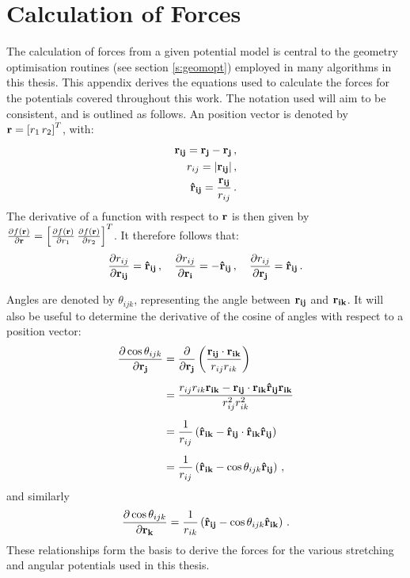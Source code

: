 \chapter{Calculation of Forces}
\label{app:forces}

The calculation of forces from a given potential model is central to the geometry optimisation routines (see section \ref{s:geomopt}) employed in many algorithms in this thesis.
This appendix derives the equations used to calculate the forces for the potentials covered throughout this work.
The notation used will aim to be consistent, and is outlined as follows.
An position vector is denoted by $\mathbf{r}=\left[r_1\, r_2\right]^{T}$, with:
\begin{align}
	\mathbf{r_{ij}}=\mathbf{r_j}-\mathbf{r_j}\,, \\
	r_{ij}=\lvert\mathbf{r_{ij}}\rvert\,, \\
	\boldsymbol{\hat{\mathbf{r}}_{\mathbf{ij}}}=\frac{\mathbf{r_{ij}}}{r_{ij}}\,.
\end{align}
The derivative of a function with respect to $\mathbf{r}$ is then given by $\frac{\partial f\left(\mathbf{r}\right) }{\partial \mathbf{r}}=\left[\frac{\partial f\left(\mathbf{r}\right)}{\partial r_1}\, \frac{\partial f\left(\mathbf{r}\right)}{\partial r_2}\right]^{T}$.
It therefore follows that:
\begin{align}
	\frac{\partial r_{ij}}{\partial\mathbf{r_{ij}}}=\boldsymbol{\hat{\mathbf{r}}_{\mathbf{ij}}}\,,\quad \frac{\partial r_{ij}}{\partial \mathbf{r_i}}=-\boldsymbol{\hat{\mathbf{r}}_{\mathbf{ij}}}\,,\quad \frac{\partial r_{ij}}{\partial \mathbf{r_j}}=\boldsymbol{\hat{\mathbf{r}}_{\mathbf{ij}}} \,.
\end{align}

Angles are denoted by $\theta_{ijk}$, representing the angle between $\mathbf{r_{ij}}$ and $\mathbf{r_{ik}}$. 
It will also be useful to determine the derivative of the cosine of angles with respect to a position vector:
\begin{align}
	\frac{\partial \cos\theta_{ijk}}{\partial \mathbf{r_j}} &= \frac{\partial}{\partial \mathbf{r_j}}\left(\frac{\mathbf{r_{ij}}\cdot\mathbf{r_{ik}}}{r_{ij}r_{ik}}\right) \nonumber \\[0.5em]
	&= \frac{r_{ij}r_{ik}\mathbf{r_{ik}}-\mathbf{r_{ij}}\cdot\mathbf{r_{ik}}\boldsymbol{\hat{\mathbf{r}}_{\mathbf{ij}}}\mathbf{r_{ik}}}{r_{ij}^2r_{ik}^2} \nonumber \\[0.5em]
	&= \frac{1}{r_{ij}}\left(\boldsymbol{\hat{\mathbf{r}}_{\mathbf{ik}}}-\boldsymbol{\hat{\mathbf{r}}_{\mathbf{ij}}}\cdot\boldsymbol{\hat{\mathbf{r}}_{\mathbf{ik}}}\boldsymbol{\hat{\mathbf{r}}_{\mathbf{ij}}}\right) \nonumber \\[0.5em]
	&= \frac{1}{r_{ij}}\left(\boldsymbol{\hat{\mathbf{r}}_{\mathbf{ik}}}-\cos\theta_{ijk}\boldsymbol{\hat{\mathbf{r}}_{\mathbf{ij}}}\right)\,,
\end{align}
and similarly
\begin{equation}
	\frac{\partial \cos\theta_{ijk}}{\partial \mathbf{r_k}} = \frac{1}{r_{ik}}\left(\boldsymbol{\hat{\mathbf{r}}_{\mathbf{ij}}}-\cos\theta_{ijk}\boldsymbol{\hat{\mathbf{r}}_{\mathbf{ik}}}\right)\,.
\end{equation}
These relationships form the basis to derive the forces for the various stretching and angular potentials used in this thesis.

